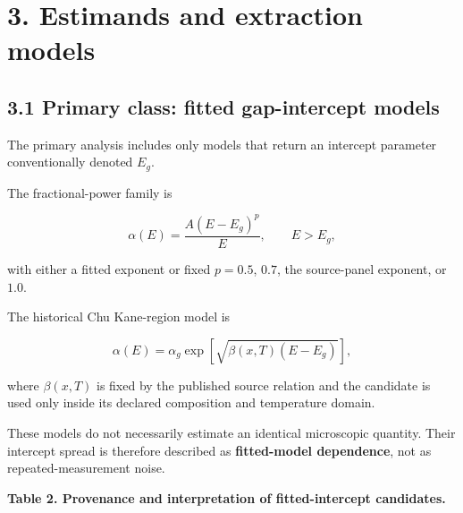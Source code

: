 \section{3. Estimands and extraction
models}\label{estimands-and-extraction-models}

\subsection{3.1 Primary class: fitted gap-intercept
models}\label{primary-class-fitted-gap-intercept-models}

The primary analysis includes only models that return an intercept
parameter conventionally denoted \(E_g\).

The fractional-power family is

\[
\alpha(E)=\frac{A(E-E_g)^p}{E}, \qquad E>E_g,
\]

with either a fitted exponent or fixed \(p=0.5\), \(0.7\), the
source-panel exponent, or \(1.0\).

The historical Chu Kane-region model \citep{Chu1994} is

\[
\alpha(E)=\alpha_g\exp\left[\sqrt{\beta(x,T)(E-E_g)}\right],
\]

where \(\beta(x,T)\) is fixed by the published source relation and the
candidate is used only inside its declared composition and temperature
domain.

These models do not necessarily estimate an identical microscopic
quantity. Their intercept spread is therefore described as
\textbf{fitted-model dependence}, not as repeated-measurement noise.

\textbf{Table 2. Provenance and interpretation of fitted-intercept
candidates.}

